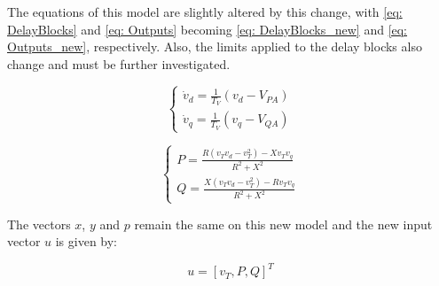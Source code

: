 The equations of this model are slightly altered by this change, with \eqref{eq: DelayBlocks} and \eqref{eq: Outputs} becoming \eqref{eq: DelayBlocks_new} and \eqref{eq: Outputs_new}, respectively. Also, the limits applied to the delay blocks also change and must be further investigated.

\begin{equation}
	\begin{cases}
		\dot{v}_{d} = \frac{1}{T_{V}}(v_{d} - V_{PA}) \\
		\dot{v}_{q} = \frac{1}{T_{V}}(v_{q} - V_{QA})
	\end{cases}
	\label{eq: DelayBlocks_new}
\end{equation}

\begin{equation}
	\begin{cases}
		P = \frac{R(v_{T}v_{d} - v_{T}^{2}) - Xv_{T}v_{q}}{R^{2} + X^{2}} \\
		Q = \frac{X(v_{T}v_{d} - v_{T}^{2}) - Rv_{T}v_{q}}{R^{2} + X^{2}}
	\end{cases}
	\label{eq: Outputs_new}
\end{equation}

The vectors $x$, $y$ and $p$ remain the same on this new model and the new input vector $u$ is given by:

\begin{equation}
	u = [v_{T}, P, Q]^T
	\label{eq: u_new}
\end{equation}